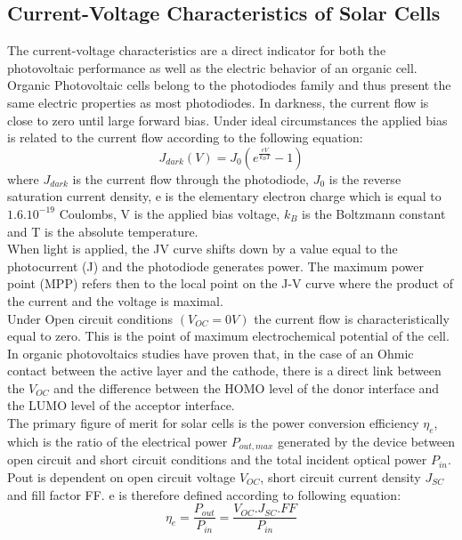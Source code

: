 \documentclass[letterpaper, 10 pt, conference]{ieeeconf}
\begin{document}
\subsection{Current-Voltage Characteristics of Solar Cells}
The current-voltage characteristics are a direct indicator for both the photovoltaic performance as well as the electric behavior of an organic cell. Organic Photovoltaic cells belong to the photodiodes family and thus present the same electric properties as most photodiodes. In darkness, the current flow is close to zero until large forward bias. Under ideal circumstances the applied bias is related to the current flow according to the following equation:
\begin{equation}
J_{dark}(V) = J_{0}(e^{\frac{eV}{k_{B}T}}-1)
\end{equation}
where $J_{dark}$ is the current flow through the photodiode, $J_{0}$ is the reverse saturation current density, e is the elementary electron charge which is equal to $1.6.10^{-19}$ Coulombs, V is the applied bias voltage, $k_{B}$ is the Boltzmann constant and T is the absolute temperature. \\
When light is applied, the JV curve shifts down by a value equal to the photocurrent (J) and the photodiode generates power. The maximum power point (MPP) refers then to the local point on the J-V curve where the product of the current and the voltage is maximal. \\
Under Open circuit conditions $(V_{OC} =0V)$ the current flow is characteristically equal to zero. This is the point of maximum electrochemical potential of the cell. \\ 
In organic photovoltaics studies have proven that, in the case of an Ohmic contact between the active layer and the cathode, there is a direct link between the $V_{OC}$ and the difference between the HOMO level of the donor interface and the LUMO level of the acceptor interface.\\
 The primary figure of merit for solar cells is the power conversion efficiency $\eta _{e}$, which is the ratio of the electrical power $P_{out, max}$ generated by the device between open circuit and short circuit conditions and the total incident optical power $P_{in}$. Pout is dependent on open circuit voltage $V_{OC}$, short circuit current density $J_{SC}$ and fill factor FF. e is therefore defined according to following equation: 
\begin{equation}
 \eta _{e} = \frac{P_{out}}{P_{in}}=\frac{V_{OC}.J_{SC}.FF}{P_{in}}
\end{equation}
\end{document}
